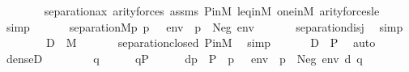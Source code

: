 \begin{isabellebody}
\ \ \ \ \ \ \isamarkupfalse%
\ separation{\isacharunderscore}{\kern0pt}ax\ arity{\isacharunderscore}{\kern0pt}forces\ assms\ P{\isacharunderscore}{\kern0pt}in{\isacharunderscore}{\kern0pt}M\ leq{\isacharunderscore}{\kern0pt}in{\isacharunderscore}{\kern0pt}M\ one{\isacharunderscore}{\kern0pt}in{\isacharunderscore}{\kern0pt}M\ arity{\isacharunderscore}{\kern0pt}forces{\isacharunderscore}{\kern0pt}le\isanewline
\ \ \ \ \isamarkupfalse%
\ simp\isanewline
\ \ \isamarkupfalse%
\isanewline
\ \ \isamarkupfalse%
\ {\isachardoublequoteopen}separation{\isacharparenleft}{\kern0pt}{\isacharhash}{\kern0pt}{\isacharhash}{\kern0pt}M{\isacharcomma}{\kern0pt}{\isasymlambda}p{\isachardot}{\kern0pt}\ {\isacharparenleft}{\kern0pt}p\ {\isasymtturnstile}\ {\isasymphi}\ env{\isacharparenright}{\kern0pt}\ {\isasymor}\ {\isacharparenleft}{\kern0pt}p\ {\isasymtturnstile}\ Neg{\isacharparenleft}{\kern0pt}{\isasymphi}{\isacharparenright}{\kern0pt}\ env{\isacharparenright}{\kern0pt}{\isacharparenright}{\kern0pt}{\isachardoublequoteclose}\ \isanewline
\ \ \ \ \isamarkupfalse%
\ separation{\isacharunderscore}{\kern0pt}disj\ \isamarkupfalse%
\ simp\isanewline
\ \ \isamarkupfalse%
\ \isanewline
\ \ \isamarkupfalse%
\ {\isachardoublequoteopen}{\isacharquery}{\kern0pt}D\ {\isasymin}\ M{\isachardoublequoteclose}\ \isanewline
\ \ \ \ \isamarkupfalse%
\ separation{\isacharunderscore}{\kern0pt}closed\ P{\isacharunderscore}{\kern0pt}in{\isacharunderscore}{\kern0pt}M\ \isamarkupfalse%
\ simp\isanewline
\ \ \isamarkupfalse%
\isanewline
\ \ \isamarkupfalse%
\ {\isachardoublequoteopen}{\isacharquery}{\kern0pt}D\ {\isasymsubseteq}\ P{\isachardoublequoteclose}\ \isamarkupfalse%
\ auto\isanewline
\ \ \isamarkupfalse%
\isanewline
\ \ \isamarkupfalse%
\ {\isachardoublequoteopen}dense{\isacharparenleft}{\kern0pt}{\isacharquery}{\kern0pt}D{\isacharparenright}{\kern0pt}{\isachardoublequoteclose}\isanewline
\ \ \isamarkupfalse%
\isanewline
\ \ \ \ \isamarkupfalse%
\ q\isanewline
\ \ \ \ \isamarkupfalse%
\ {\isachardoublequoteopen}q{\isasymin}P{\isachardoublequoteclose}\isanewline
\ \ \ \ \isamarkupfalse%
\ {\isachardoublequoteopen}{\isasymexists}d{\isasymin}{\isacharbraceleft}{\kern0pt}p\ {\isasymin}\ P\ {\isachardot}{\kern0pt}\ {\isacharparenleft}{\kern0pt}p\ {\isasymtturnstile}\ {\isasymphi}\ env{\isacharparenright}{\kern0pt}\ {\isasymor}\ {\isacharparenleft}{\kern0pt}p\ {\isasymtturnstile}\ Neg{\isacharparenleft}{\kern0pt}{\isasymphi}{\isacharparenright}{\kern0pt}\ env{\isacharparenright}{\kern0pt}{\isacharbraceright}{\kern0pt}{\isachardot}{\kern0pt}\ d{\isasympreceq}\ q{\isachardoublequoteclose}\isanewline

\end{isabellebody}
